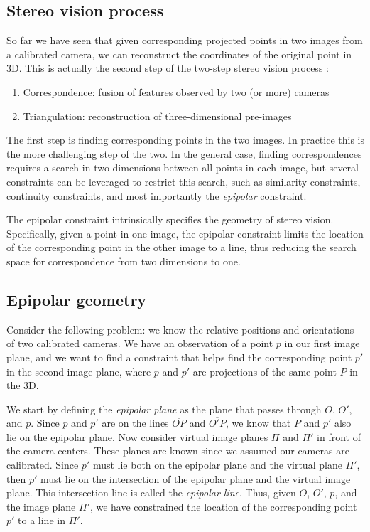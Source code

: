 \documentclass[twoside]{article}
\begin{document}
\subsection{Stereo vision process}

So far we have seen that given corresponding projected points in two images from a calibrated camera, we can reconstruct the coordinates of the original point in 3D. This is actually the second step of the two-step stereo vision process :

\begin{enumerate}
  \item Correspondence: fusion of features observed by two (or more) cameras
  \item Triangulation: reconstruction of three-dimensional pre-images
\end{enumerate}

The first step is finding corresponding points in the two images. In practice this is the more challenging step of the two. In the general case, finding correspondences requires a search in two dimensions between all points in each image, but several constraints can be leveraged to restrict this search, such as similarity constraints, continuity constraints, and most importantly the \emph{epipolar} constraint.

The epipolar constraint intrinsically specifies the geometry of stereo vision. Specifically, given a point in one image, the epipolar constraint limits the location of the corresponding point in the other image to a line, thus reducing the search space for correspondence from two dimensions to one.

\subsection{Epipolar geometry}

Consider the following problem: we know the relative positions and orientations of two calibrated cameras. We have an observation of a point $p$ in our first image plane, and we want to find a constraint that helps find the corresponding point $p'$ in the second image plane, where $p$ and $p'$ are projections of the same point $P$ in the 3D.

We start by defining the \emph{epipolar plane} as the plane that passes through $O$, $O'$, and $p$. Since $p$ and $p'$ are on the lines $\overline{OP}$ and $\overline{O'P}$, we know that $P$ and $p'$ also lie on the epipolar plane. Now consider virtual image planes $\Pi$ and $\Pi'$ in front of the camera centers. These planes are known since we assumed our cameras are calibrated. Since $p'$ must lie both on the epipolar plane and the virtual plane $\Pi'$, then $p'$ must lie on the intersection of the epipolar plane and the virtual image plane. This intersection line is called the \emph{epipolar line}. Thus, given $O$, $O'$, $p$, and the image plane $\Pi'$, we have constrained the location of the corresponding point $p'$ to a line in $\Pi'$.
\end{document}
